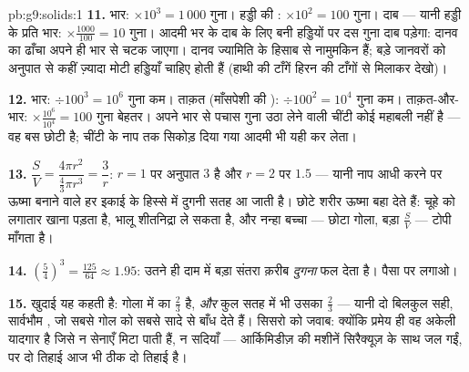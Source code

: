 \begin{solution}{pb:g9:solids:1}
\textbf{11.} भार: $\times 10^3 = 1\,000$ गुना। हड्डी की : $\times 10^2 = 100$ गुना। दाब --- यानी हड्डी के प्रति
 भार: $\times \frac{1000}{100} = 10$ गुना। आदमी भर के दाब
के लिए बनी हड्डियों पर दस गुना दाब पड़ेगा: दानव का ढाँचा अपने ही
भार से चटक जाएगा। दानव ज्यामिति के हिसाब से नामुमकिन हैं; बड़े
जानवरों को अनुपात से कहीं ज़्यादा मोटी हड्डियाँ चाहिए होती हैं
(हाथी की टाँगें हिरन की टाँगों से मिलाकर देखो)।

\textbf{12.} भार: $\div 100^3 = 10^6$ गुना कम। ताक़त (माँसपेशी की
): $\div 100^2 = 10^4$ गुना कम। ताक़त-और-भार:
$\times \frac{10^6}{10^4} = 100$ गुना बेहतर। अपने भार से पचास गुना
उठा लेने वाली चींटी कोई महाबली नहीं है --- वह बस छोटी है; चींटी के
नाप तक सिकोड़ दिया गया आदमी भी यही कर लेता।

\textbf{13.} $\dfrac{S}{V} = \dfrac{4\pi r^2}{\frac43\pi r^3}
= \dfrac{3}{r}$: $r = 1$ पर अनुपात $3$ है और $r = 2$ पर $1.5$ ---
यानी नाप आधी करने पर ऊष्मा बनाने वाले हर इकाई  के हिस्से में
दुगनी सतह आ जाती है। छोटे शरीर ऊष्मा बहा देते हैं: चूहे को लगातार
खाना पड़ता है, भालू शीतनिद्रा ले सकता है, और नन्हा बच्चा --- छोटा
गोला, बड़ा $\frac SV$ --- टोपी माँगता है।

\textbf{14.} $\left(\frac54\right)^3 = \frac{125}{64} \approx
1.95$: उतने ही दाम में बड़ा संतरा क़रीब \emph{दुगना} फल देता है।
पैसा  पर लगाओ।

\textbf{15.} खुदाई यह कहती है: गोला  में  का $\frac23$ है,
\emph{और} कुल सतह में भी उसका $\frac23$ --- यानी दो बिलकुल सही,
सार्वभौम , जो सबसे गोल  को सबसे सादे  से बाँध देते
हैं। सिसरो को जवाब: क्योंकि प्रमेय ही वह अकेली यादगार है जिसे न
सेनाएँ मिटा पाती हैं, न सदियाँ --- आर्किमिडीज़ की मशीनें
सिरैक्यूज़ के साथ जल गईं, पर दो तिहाई आज भी ठीक दो तिहाई है।

\end{solution}
